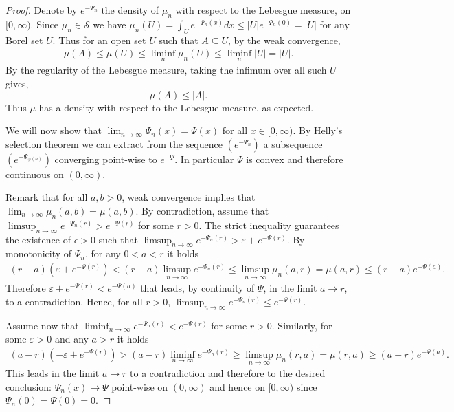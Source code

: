\documentclass[11pt]{article}
\newcommand{\1}{[1]}
\begin{document}
\begin{proof}
Denote by $e^{-\Psi_n}$ the density of $\mu_n$ with respect to the Lebesgue measure,
on $[0,\infty)$. Since $\mu_n \in \mathcal{S}$ we have $\mu_n(U) = \int_U e^{-\Psi_n(x)} dx \leq |U| e^{- \Psi_n(0)} = |U|$ for any Borel set $U$.  Thus for an open set $U$ such that $A \subseteq U$, by the weak convergence,
\begin{align*}
    \mu(A) \leq \mu(U) \leq \liminf_n \mu_n(U) \leq \liminf_n |U| = |U|.
\end{align*}
By the regularity of the Lebesgue measure, taking the infimum over all such $U$ gives,
\[
    \mu(A) \leq |A|.
\]
Thus $\mu$ has a density with respect to the Lebesgue measure, as expected. 

We will now show that $\lim_{n\rightarrow\infty}\Psi_{n}(x)=\Psi(x)$ for all $x \in [0,\infty)$.
By Helly's selection theorem we can extract from the sequence $(e^{-\Psi_n})$ a subsequence $(e^{-\Psi_{\varphi(n)}})$ converging point-wise to $e^{-\Psi}$.
In particular $\Psi$ is convex and therefore continuous on $(0,\infty)$.  



Remark that for all $a,b>0$, weak convergence implies that $\lim_{n\rightarrow\infty}\mu_{n}(a,b)=\mu(a,b)$. By contradiction, assume that $\limsup_{n\rightarrow\infty}e^{-\Psi_{n}(r)}>e^{-\Psi(r)}$ for some $r > 0$. 
The strict inequality guarantees  the existence of $\epsilon>0$ such that $\limsup_{n\rightarrow\infty}e^{-\Psi_{n}(r)} > \varepsilon + e^{-\Psi(r)}$. By monotonicity of $\Psi_n$, for any $0<a<r$ it holds
     \begin{align*}
      (r-a)(\varepsilon + e^{-\Psi(r)})
      < (r-a) \limsup_{n\rightarrow\infty} e^{-\Psi_n(r)} 
      \leq 
      \limsup_{n\rightarrow\infty}\mu_{n}(a,r)
      =\mu(a,r) 
      \leq (r-a)e^{-\Psi(a)} .
      \end{align*} 
      Therefore $\varepsilon + e^{-\Psi(r)} < e^{-\Psi(a)}$ that leads, by continuity of $\Psi$, in the limit $a \to r$, to a contradiction. Hence,  for all $r >0$, $\limsup_{n\rightarrow\infty}e^{-\Psi_{n}(r)} \leq e^{-\Psi(r)}$.
     
     Assume now that  $\liminf_{n\rightarrow\infty}e^{-\Psi_{n}(r)}<e^{-\Psi(r)}$ for some $r > 0$. Similarly, for some $\varepsilon>0$ and any $a>r$ it holds
  \begin{align*}
      (a-r)(-\varepsilon + e^{-\Psi(r)})
      > (a-r) \liminf_{n\rightarrow\infty} e^{-\Psi_n(r)} 
      \geq 
      \limsup_{n\rightarrow\infty}\mu_{n}(r,a)
      =\mu(r,a) 
      \geq (a-r)e^{-\Psi(a)} .
      \end{align*}    
This leads in the limit $a \to r$ to a contradiction and therefore to the desired conclusion: $\Psi_n(x) \to \Psi$ point-wise on $(0,\infty)$ and hence on $[0,\infty)$ since $\Psi_n(0)=\Psi(0)=0$.




\end{proof}
\end{document}
